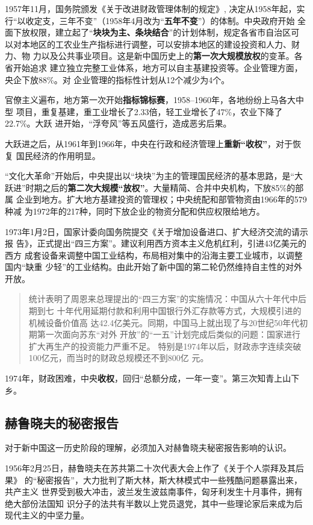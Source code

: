 1957年11月，国务院颁发《关于改进财政管理体制的规定》, 决定从1958年起，实
行“以收定支，三年不变”（1958年4月改为“\textbf{五年不变}”）的体制。中央政府开始
全面下放权限，建立起了“\textbf{块块为主、条块结合}”的计划体制，规定各省市自治区可
以对本地区的工农业生产指标进行调整，可以安排本地区的建设投资和人力、财力、物
力以及公共事业项目。这是新中国历史上的\textbf{第一次大规模放权}的变革。各省开始追求
建立独立完整工业体系，地方可以自主基建投资等。企业管理方面，央企下放88\%。对
企业管理的指标性计划从12个减少为4个。

官僚主义遍布，地方第一次开始\textbf{指标锦标赛}，1958--1960年，各地纷纷上马各大中型
项目，重复基建，重工业增长了2.33倍，轻工业增长了47\%，农业下降了22.7\%。大跃
进开始，“浮夸风”等五风盛行，造成恶劣后果。

大跃进之后，从1961年到1966年，中央在行政和经济管理上\textbf{重新“收权”}，对于恢复
国民经济的作用明显。

“文化大革命”开始后，中央提出以“块块”为主的管理国民经济的基本思路，是“大
跃进”时期之后的\textbf{第二次大规模“放权”}。大量精简、合并中央机构，下放85\%的部属
企业到地方。扩大地方基建投资的管理权；中央统配和部管物资由1966年的579种减
为1972年的217种，同时下放企业的物资分配和供应权限给地方。

1973年1月2日，国家计委向国务院提交《关于增加设备进口、扩大经济交流的请示报
告》，正式提出“四三方案”。建议利用西方资本主义危机红利，引进43亿美元的西方
成套设备来调整中国工业结构，布局相对集中的沿海主要工业城市，以调整国内“缺重
少轻”的工业结构。由此开始了新中国的第二轮仍然维持自主性的对外开放。
\begin{quotation}
  统计表明了周恩来总理提出的“四三方案”的实施情况：中国从六十年代中后期到七
  十年代用延期付款和利用中国银行外汇存款等方式，大规模引进的机械设备价值高
  达42.4亿美元。同期，中国马上就出现了与20世纪50年代初期第一次面向苏东“对外
  开放”的“一五”计划完成后类似的问题：国家进行扩大再生产的投资能力严重不足。
  特别是1974年以后，财政赤字连续突破100亿元，而当时的财政总规模还不到800亿
  元。\cite{wenbaci}
\end{quotation}
1974年，财政困难，中央\textbf{收权}，回归“总额分成，一年一变”。第三次知青上山下乡。

\subsection{赫鲁晓夫的秘密报告}

对于新中国这一历史阶段的理解，必须加入对赫鲁晓夫秘密报告影响的认识。

1956年2月25日，赫鲁晓夫在苏共第二十次代表大会上作了《关于个人崇拜及其后果》
的“秘密报告”，大力批判了斯大林，斯大林模式中一些残酷问题暴露出来，共产主义
世界受到极大冲击，波兰发生波兹南事件，匈牙利发生十月事件，拥有绝大部份法国知
识分子的法共有半数以上党员退党，其中一些理论家后来成为后现代主义的中坚力量。


